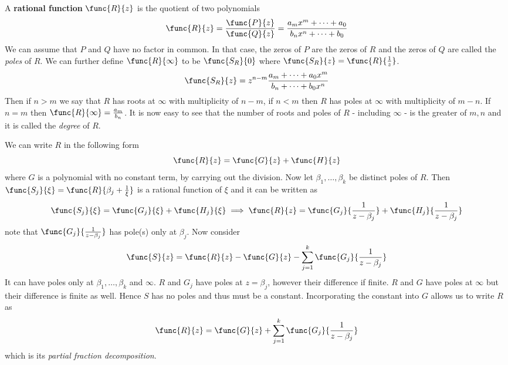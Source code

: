 A \textbf{rational function} \(\func{R}{z}\) is the quotient of two polynomials
\begin{equation*}
      \func{R}{z} = \dfrac{\func{P}{z}}{\func{Q}{z}} = \dfrac{a_m x^m + \dots + a_0}{b_n x^n + \dots + b_0}
\end{equation*}
We can assume that \(P\) and \(Q\) have no factor in common. In that case, the zeros of \(P\) are the zeros of \(R\) and the zeros of \(Q\) are called the \textit{poles} of \(R\). We can further define \(\func{R}{\infty}\) to be \(\func{S_R}{0}\) where \(\func{S_R}{z} = \func{R}{\frac{1}{z}}\). 
\begin{equation*}
      \func{S_R}{z} = z^{n-m} \dfrac{a_m + \dots + a_0 x^m}{b_n + \dots + b_0 x^n}
\end{equation*}
Then if \(n > m\) we say that \(R\) has roots at \(\infty\) with multiplicity of \(n - m\), if \(n < m\) then \(R\) has poles at \(\infty\) with multiplicity of \(m  - n\). If \(n = m\) then \(\func{R}{\infty} = \frac{a_m}{b_n}\). It is now easy to see that the number of roots and poles of \(R\) - including \(\infty\) - is the greater of \(m,n\) and it is called the \textit{degree} of \(R\). 

We can write \(R\) in the following form 
\begin{equation*}
      \func{R}{z} = \func{G}{z} + \func{H}{z}
\end{equation*}
where \(G\) is a polynomial with no constant term, by carrying out the division. Now let \(\beta_1 , \dots , \beta_k\) be distinct poles of \(R\). Then \(\func{S_j}{\xi} = \func{R}{\beta_j + \frac{1}{\xi}}\) is a rational function of \(\xi\) and it can be written as 
\begin{equation*}
      \func{S_j}{\xi} = \func{G_j}{\xi} + \func{H_j}{\xi} \implies \func{R}{z}= \func{G_j}{\dfrac{1}{z - \beta_j}} + \func{H_j}{\dfrac{1}{z - \beta_j}}
\end{equation*}
note that \(\func{G_j}{\frac{1}{z - \beta_j}}\) has pole(s) only at \(\beta_j\). Now consider 
\begin{equation*}
      \func{S}{z} = \func{R}{z} - \func{G}{z} - \sum_{j = 1}^k \func{G_j}{\dfrac{1}{z - \beta_j}}
\end{equation*}
It can have poles only at \(\beta_1 , \dots , \beta_k\) and \(\infty\). \(R\) and \(G_j\) have poles at \(z = \beta_j\), however their difference if finite. \(R\) and \(G\) have poles at \(\infty\) but their difference is finite as well. Hence \(S\) has no poles and thus must be a constant. Incorporating the constant into \(G\) allows us to write \(R\) as 
\begin{equation*}
      \func{R}{z} = \func{G}{z} + \sum_{j = 1}^k \func{G_j}{\dfrac{1}{z - \beta_j}}
\end{equation*}
which is its \textit{partial fraction decomposition}.

